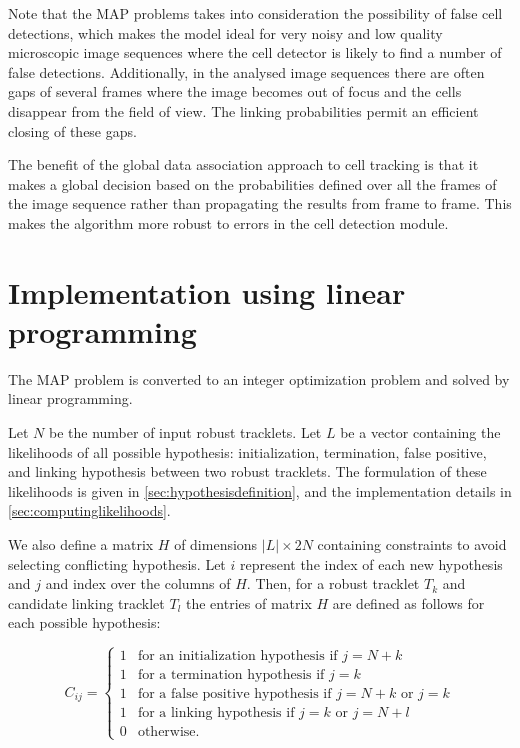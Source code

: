   	 	Note that the MAP problems takes into consideration the possibility of false cell detections, which makes the model ideal for very noisy and low quality microscopic image sequences where the cell detector is likely to find a number of false detections. Additionally, in the analysed image sequences there are often gaps of several frames where the image becomes out of focus and the cells disappear from the field of view. The linking probabilities permit an efficient closing of these gaps.
  	 	
  	 	The benefit of the global data association approach to cell tracking is that it makes a global decision based on the probabilities defined over all the frames of the image sequence rather than propagating the results from frame to frame. This makes the algorithm more robust to errors in the cell detection module.
  	 	
	\section{Implementation using linear programming \statusfirstdraft}
		The MAP problem is converted to an integer optimization problem and solved by linear programming.
		
		Let $N$ be the number of input robust tracklets. Let $L$ be a vector containing the likelihoods of all possible hypothesis: initialization, termination, false positive, and linking hypothesis between two robust tracklets. The formulation of these likelihoods is given in \cref{sec:hypothesisdefinition}, and the implementation details in \cref{sec:computinglikelihoods}.
		
		We also define a matrix $H$ of dimensions $|L| \times 2N$ containing constraints to avoid selecting conflicting hypothesis. Let $i$ represent the index of each new hypothesis and $j$ and index over the columns of $H$. Then, for a robust tracklet $T_k$ and candidate linking tracklet $T_l$ the entries of matrix $H$ are defined as follows for each possible hypothesis:
		
		\[
			C_{ij} = \begin{cases}
			1 & \text{for an initialization hypothesis if } j = N + k \\
			1 & \text{for a termination hypothesis if } j = k \\
			1 & \text{for a false positive hypothesis if } j = N + k \text{ or } j = k \\
			1 & \text{for a linking hypothesis if } j = k \text{ or } j = N + l \\
			0 & \text{otherwise.}
			\end{cases}
		\]
		
